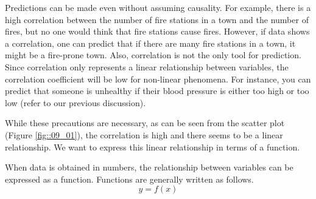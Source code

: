 \documentclass{ltjbook}
\begin{document}
Predictions can be made even without assuming causality. For example, there is a high correlation between the number of fire stations in a town and the number of fires, but no one would think that fire stations cause fires. However, if data shows a correlation, one can predict that if there are many fire stations in a town, it might be a fire-prone town. Also, correlation is not the only tool for prediction. Since correlation only represents a linear relationship between variables, the correlation coefficient will be low for non-linear phenomena. For instance, you can predict that someone is unhealthy if their blood pressure is either too high or too low (refer to our previous discussion).

While these precautions are necessary, as can be seen from the scatter plot (Figure \ref{fig::09_01}), the correlation is high and there seems to be a linear relationship. We want to express this linear relationship in terms of a function.

When data is obtained in numbers, the relationship between variables can be expressed as a function. Functions are generally written as follows.
\[ y = f(x) \]

\end{document}

